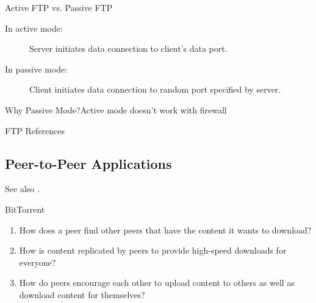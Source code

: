 \begin{frame}{Active FTP vs. Passive FTP}
  \begin{description}
  \item[In active mode:] Server initiates data connection to client's data port.
  \item[In passive mode:] Client initiates data connection to random port specified by
    server.
  \end{description}
\end{frame}

\begin{frame}{Why Passive Mode?}{Active mode doesn't work with firewall}
  \centering
  \mode<beamer>{ \texttt{[image: ftp-firewall]} }%
\end{frame}

\begin{frame}{FTP References}
  \begin{refsection}
    \nocite{wiki:ftp, rfc959,rfc1579}
    \printbibliography[heading=none]
  \end{refsection}
\end{frame}

\subsection{Peer-to-Peer Applications}

See also .
  
\begin{frame}{BitTorrent}
  \centering
  \mode<beamer>{\texttt{[image: bt-ast]} }%

  {\footnotesize
    \begin{enumerate}
    \item How does a peer find other peers that have the content it wants to download?
    \item How is content replicated by peers to provide high-speed downloads for everyone?
    \item How do peers encourage each other to upload content to others as well as
      download content for themselves?
    \end{enumerate}}
\end{frame}

